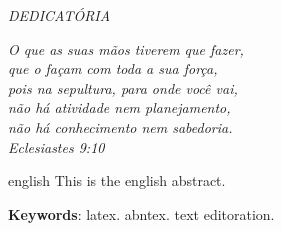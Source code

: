 \documentclass[12pt,openright,oneside,a4paper,english,brazil]{abntex2}
\begin{document}
\begin{dedicatoria}
	 \vspace*{\fill}
	 \centering
	 \noindent
	 \textit{ DEDICATÓRIA} \vspace*{\fill}
\end{dedicatoria}

\begin{agradecimentos}


\end{agradecimentos}

\begin{epigrafe}
		\vspace*{\fill}
	\begin{flushright}
		\textit{O que as suas mãos tiverem que fazer,\\
		que o façam com toda a sua força,\\
		pois na sepultura, para onde você vai,\\
		não há atividade nem planejamento,\\
		não há conhecimento nem sabedoria.\\
Eclesiastes 9:10}
	\end{flushright}
\end{epigrafe}


\setlength{\absparsep}{18pt} %
\begin{resumo}

\end{resumo}

\begin{resumo}[Abstract]
 \begin{otherlanguage*}{english}
	This is the english abstract.

	\vspace{\onelineskip}
 
	\noindent 
	\textbf{Keywords}: latex. abntex. text editoration.
 \end{otherlanguage*}
\end{resumo}


\listoffigures*
\cleardoublepage

\listoftables*
\cleardoublepage
\end{document}
